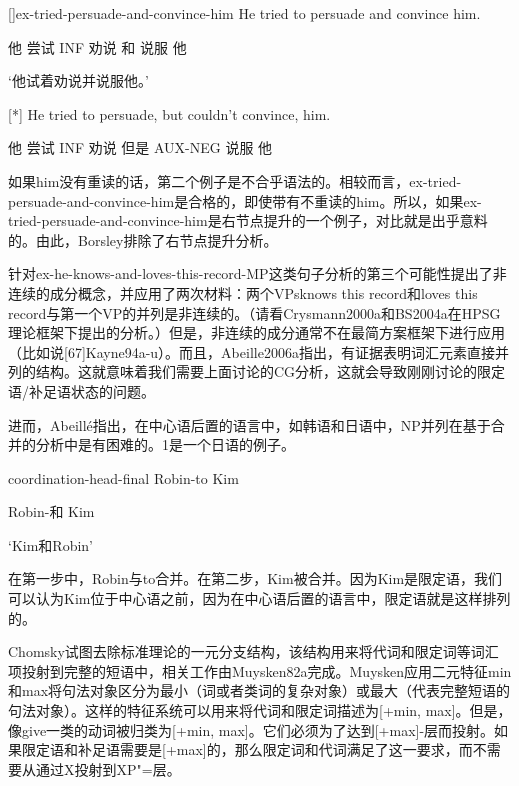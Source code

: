 []ex-tried-persuade-and-convince-him
He tried to persuade and convince him.

他 尝试 INF 劝说 和 说服 他

`他试着劝说并说服他。'

[*]
He tried to persuade, but couldn't convince, him.

他 尝试 INF 劝说 但是 AUX-NEG 说服 他



如果him没有重读的话，第二个例子是不合乎语法的。相较而言，ex-tried-persuade-and-convince-him是合格的，即使带有不重读的him。所以，如果ex-tried-persuade-and-convince-him是右节点提升的一个例子，对比就是出乎意料的。由此，Borsley排除了右节点提升分析。





针对ex-he-knows-and-loves-this-record-MP这类句子分析的第三个可能性提出了非连续的成分概念，并应用了两次材料：两个VPsknows this record和loves this record与第一个VP的并列是非连续的。（请看Crysmann2000a和BS2004a在HPSG理论框架下提出的分析。）但是，非连续的成分通常不在最简方案框架下进行应用（比如说[67]Kayne94a-u）。而且，Abeille2006a指出，有证据表明词汇元素直接并列的结构。这就意味着我们需要上面讨论的CG分析，这就会导致刚刚讨论的限定语/补足语状态的问题。









进而，Abeillé指出，在中心语后置的语言中，如韩语和日语中，NP并列在基于合并的分析中是有困难的。1是一个日语的例子。



coordination-head-final
Robin-to Kim

     Robin-和 Kim

`Kim和Robin'



在第一步中，Robin与to合并。在第二步，Kim被合并。因为Kim是限定语，我们可以认为Kim位于中心语之前，因为在中心语后置的语言中，限定语就是这样排列的。




Chomsky试图去除标准理论的一元分支结构，该结构用来将代词和限定词等词汇项投射到完整的短语中，相关工作由Muysken82a完成。Muysken应用二元特征min和max将句法对象区分为最小（词或者类词的复杂对象）或最大（代表完整短语的句法对象）。这样的特征系统可以用来将代词和限定词描述为[+min, max]。但是，像give一类的动词被归类为[+min,  max]。它们必须为了达到[+max]-层而投射。如果限定语和补足语需要是[+max]的，那么限定词和代词满足了这一要求，而不需要从通过X投射到XP"=层。










